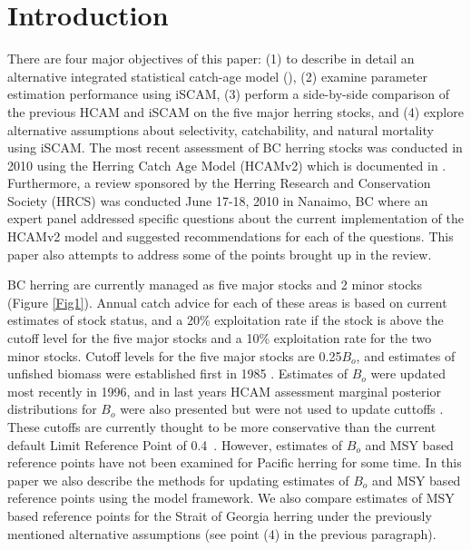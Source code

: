 

\section{Introduction}
	
There are four major objectives of this paper: (1) to describe in detail an alternative integrated statistical catch-age model (\iscam), (2) examine parameter estimation performance using iSCAM, (3) perform a side-by-side comparison of the previous HCAM and iSCAM on the five major herring stocks, and (4) explore alternative assumptions about selectivity, catchability, and natural mortality using iSCAM.  The most recent assessment of BC herring stocks was conducted in 2010 using the Herring Catch Age Model (HCAMv2) which is documented in \cite{Clear2010}.  Furthermore, a review sponsored by the Herring Research and Conservation Society (HRCS) was conducted June 17-18, 2010 in Nanaimo, BC where an expert panel addressed specific questions about the current implementation of the HCAMv2 model and suggested recommendations for each of the questions.  This paper also attempts to address some of the points brought up in the review.

BC herring are currently managed as five major stocks and 2 minor stocks (Figure \ref{Fig1}).  Annual catch advice for each of these areas is based on current estimates of stock status, and a 20\% exploitation rate if the stock is above the cutoff level for the five major stocks and a 10\% exploitation rate for the two minor stocks.  Cutoff levels for the five major stocks are  0.25$B_o$, and estimates of unfished biomass were established first in 1985 \citep{haist1986stock}.  Estimates of $B_o$ were updated most recently in 1996, and in last years HCAM assessment marginal posterior distributions for $B_o$ were also presented but were not used to update cuttoffs \citep{Clear2010}.  These cutoffs are currently thought to be more conservative 	than the current default Limit Reference Point of 0.4\bmsy\ \citep{dfo2006}. However, estimates of $B_o$ and MSY based reference points have not been examined for Pacific herring for some time.  In this paper we also describe the methods for updating estimates of $B_o$ and MSY based reference points using the \iscam model framework.  We also compare estimates of MSY based reference points for the Strait of Georgia herring under the previously mentioned alternative assumptions (see point (4) in the previous paragraph).

